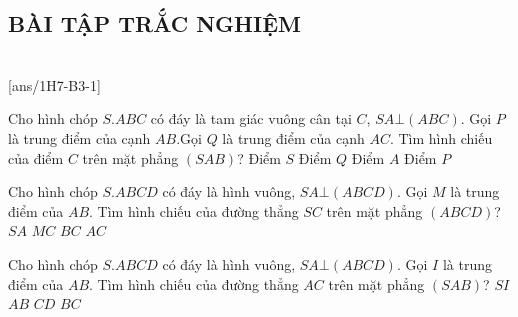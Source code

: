 \subsection{BÀI TẬP TRẮC NGHIỆM}
 \\
\setcounter{ex}{0}
[ans/1H7-B3-1]

\begin{ex}
	Cho hình chóp ${S.ABC}$ có đáy là tam giác vuông cân tại ${C}$, $SA\bot (ABC)$. Gọi ${P}$ là trung điểm của cạnh ${AB}$.Gọi ${Q}$ là trung điểm của cạnh ${AC}$. Tìm hình chiếu của điểm ${C}$ trên mặt phẳng $(SAB)$?	
	\choice
	{ Điểm ${S}$ }
	{ Điểm ${Q}$ }
	{ Điểm ${A}$ }
	{ \True Điểm ${P}$ }
	\end{ex}

\begin{ex}
	Cho hình chóp ${S.ABCD}$ có đáy là hình vuông, $SA\bot (ABCD)$. Gọi ${M}$ là trung điểm của ${AB}$. Tìm hình chiếu của đường thẳng ${SC}$ trên mặt phẳng $(ABCD)$?
	\choice
	{ ${SA}$ }
	{ ${MC}$ }
	{ ${BC}$ }
	{ \True ${AC}$ }
	\end{ex}

\begin{ex}
	Cho hình chóp ${S.ABCD}$ có đáy là hình vuông, $SA\bot (ABCD)$. Gọi ${I}$ là trung điểm của ${AB}$. Tìm hình chiếu của đường thẳng ${AC}$ trên mặt phẳng $(SAB)$?
	\choice
	{ ${SI}$ }
	{ \True ${AB}$ }
	{ ${CD}$ }
	{ ${BC}$ }
	\end{ex}

